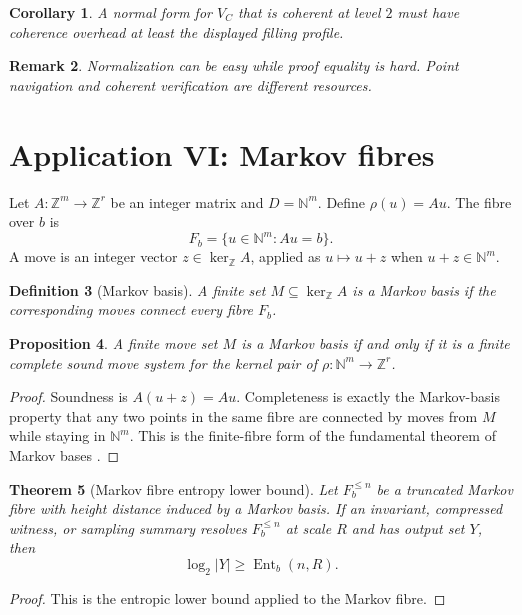 \documentclass[11pt]{article}
\newtheorem{theorem}{Theorem}[section]
\newtheorem{proposition}[theorem]{Proposition}
\newtheorem{corollary}[theorem]{Corollary}
\newtheorem{definition}[theorem]{Definition}
\newtheorem{remark}[theorem]{Remark}
\DeclareMathOperator{\Ent}{Ent}
\begin{document}
\begin{corollary}
A normal form for \(V_C\) that is coherent at level \(2\) must have coherence overhead at least the displayed filling profile.
\end{corollary}

\begin{remark}
Normalization can be easy while proof equality is hard.  Point navigation and coherent verification are different resources.
\end{remark}

\section{Application VI: Markov fibres}

Let \(A:\mathbb Z^m\to\mathbb Z^r\) be an integer matrix and \(D=\mathbb N^m\).  Define \(\rho(u)=Au\).  The fibre over \(b\) is
\[
F_b=\{u\in\mathbb N^m:Au=b\}.
\]
A move is an integer vector \(z\in\ker_{\mathbb Z}A\), applied as \(u\mapsto u+z\) when \(u+z\in\mathbb N^m\).

\begin{definition}[Markov basis]
A finite set \(M\subseteq\ker_{\mathbb Z}A\) is a Markov basis if the corresponding moves connect every fibre \(F_b\).
\end{definition}

\begin{proposition}
A finite move set \(M\) is a Markov basis if and only if it is a finite complete sound move system for the kernel pair of \(\rho:\mathbb N^m\to\mathbb Z^r\).
\end{proposition}

\begin{proof}
Soundness is \(A(u+z)=Au\).  Completeness is exactly the Markov-basis property that any two points in the same fibre are connected by moves from \(M\) while staying in \(\mathbb N^m\).  This is the finite-fibre form of the fundamental theorem of Markov bases \cite{diaconis-sturmfels}.
\end{proof}

\begin{theorem}[Markov fibre entropy lower bound]
Let \(F_b^{\le n}\) be a truncated Markov fibre with height distance induced by a Markov basis.  If an invariant, compressed witness, or sampling summary resolves \(F_b^{\le n}\) at scale \(R\) and has output set \(Y\), then
\[
\log_2|Y|\ge\Ent_b(n,R).
\]
\end{theorem}

\begin{proof}
This is the entropic lower bound applied to the Markov fibre.
\end{proof}
\end{document}
